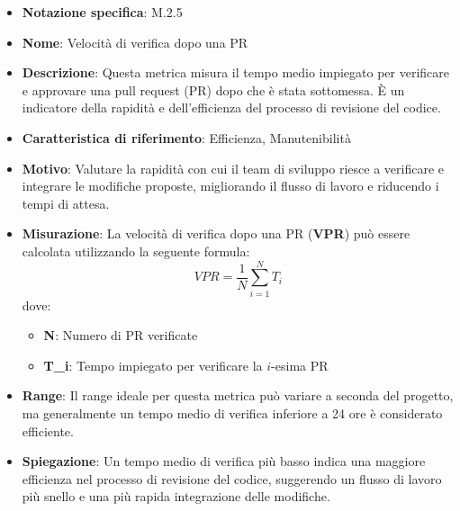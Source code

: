 \begin{itemize}
    \item \textbf{Notazione specifica}: M.2.5
    \item \textbf{Nome}: Velocità di verifica dopo una PR
    \item \textbf{Descrizione}: Questa metrica misura il tempo medio impiegato per verificare e approvare una pull request (PR) dopo che è stata sottomessa. È un indicatore della rapidità e dell'efficienza del processo di revisione del codice.
    \item \textbf{Caratteristica di riferimento}: Efficienza, Manutenibilità
    \item \textbf{Motivo}: Valutare la rapidità con cui il team di sviluppo riesce a verificare e integrare le modifiche proposte, migliorando il flusso di lavoro e riducendo i tempi di attesa.
    \item \textbf{Misurazione}: La velocità di verifica dopo una PR (\textbf{VPR}) può essere calcolata utilizzando la seguente formula:
    \[ VPR = \frac{1}{N} \sum_{i=1}^{N} T_i \]
    dove:
    \begin{itemize}
        \item \textbf{N}: Numero di PR verificate
        \item \textbf{T_i}: Tempo impiegato per verificare la \(i\)-esima PR
    \end{itemize}
    \item \textbf{Range}: Il range ideale per questa metrica può variare a seconda del progetto, ma generalmente un tempo medio di verifica inferiore a 24 ore è considerato efficiente.
    \item \textbf{Spiegazione}: Un tempo medio di verifica più basso indica una maggiore efficienza nel processo di revisione del codice, suggerendo un flusso di lavoro più snello e una più rapida integrazione delle modifiche.
\end{itemize}
